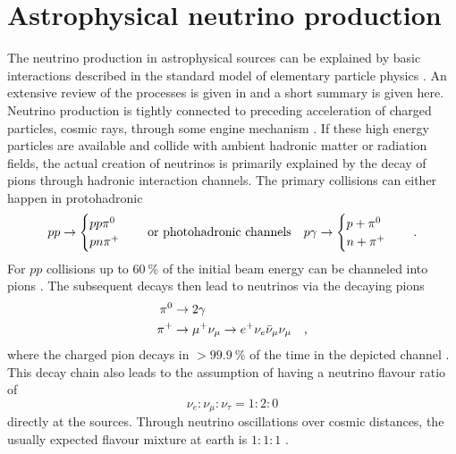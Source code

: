 \section{Astrophysical neutrino production}
  \label{chp:astro_nu_production}
The neutrino production in astrophysical sources can be explained by basic interactions described in the standard model of elementary particle physics .
An extensive review of the processes is given in  and a short summary is given here.
Neutrino production is tightly connected to preceding acceleration of charged particles, cosmic rays, through some engine mechanism .
If these high energy particles are available and collide with ambient hadronic matter or radiation fields, the actual creation of neutrinos is primarily explained by the decay of pions through hadronic interaction channels.
The primary collisions can either happen in protohadronic
\begin{equation}
  p p \rightarrow
    \begin{cases}
      p p \pi^0 \\
      p n \pi^+
    \end{cases}
    \quad\text{or photohadronic channels}\quad
  p \gamma \rightarrow
    \begin{cases}
      p + \pi^0 \\
      n + \pi^+
    \end{cases}
  \quad\text{.}
\end{equation}
For $pp$ collisions up to $\SI{60}{\percent}$ of the initial beam energy can be channeled into pions .
The subsequent decays then lead to neutrinos via the decaying pions
\begin{align}
  \pi^0 &\rightarrow 2\gamma \\
  \pi^+ &\rightarrow \mu^+ \nu_\mu \rightarrow e^+ \nu_e \bar{\nu}_\mu \nu_\mu
  \quad\text{,}
\end{align}
where the charged pion decays in $>\SI{99,9}{\percent}$ of the time in the depicted channel .
This decay chain also leads to the assumption of having a neutrino flavour ratio of
\begin{equation}
  \nu_e : \nu_\mu : \nu_\tau = 1 : 2 : 0
\end{equation}
directly at the sources.
Through neutrino oscillations over cosmic distances, the usually expected flavour mixture at earth is $1:1:1$ .

